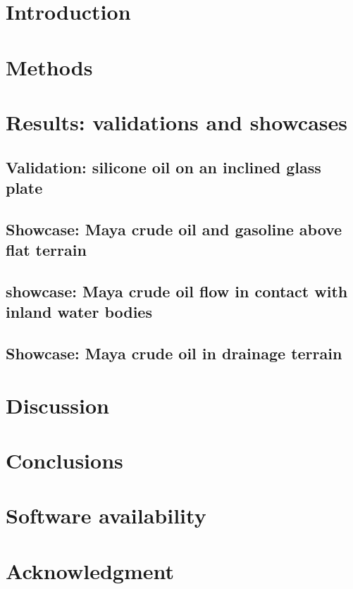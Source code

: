 \documentclass{cas-sc} %
\numberwithin{equation}{section}
\begin{document}

\maketitle

\section{Introduction}

\section{Methods}

\section{Results: validations and showcases}
\subsection{Validation: silicone oil on an inclined glass plate}
\subsection{Showcase: Maya crude oil and gasoline above flat terrain}
\subsection{showcase: Maya crude oil flow in contact with inland water bodies}
\subsection{Showcase: Maya crude oil in drainage terrain}

\section{Discussion}

\section{Conclusions}

\section*{Software availability}

\section*{Acknowledgment}


\sloppy %
\printbibliography
\fussy %

%
%
\end{document}
